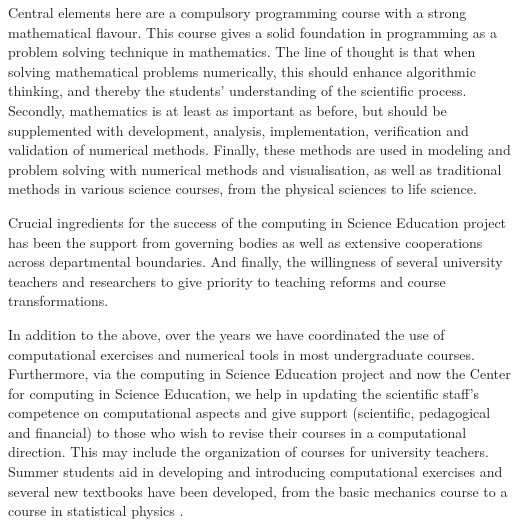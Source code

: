 \documentclass[graybox,envcountchap,sectrefs]{svmult}
\begin{document}
Central elements here are a compulsory programming course with a
strong mathematical flavour. This course gives a solid foundation in
programming as a problem solving technique in mathematics. The line of
thought is that when solving mathematical problems numerically, this should enhance
algorithmic thinking, and thereby the students' understanding of the
scientific process.  Secondly, mathematics is at least as important as
before, but should be supplemented with development, analysis,
implementation, verification and validation of numerical
methods. Finally, these methods are used in modeling and problem
solving with numerical methods and visualisation, as well as
traditional methods in various science courses, from the physical
sciences to life science.

Crucial ingredients for the success of the computing in Science
Education project has been the support from governing bodies as well
as extensive cooperations across departmental boundaries. And finally,
the willingness of several university teachers and researchers to give
priority to teaching reforms and course transformations.

In addition to the above, over the years we have coordinated the use
of computational exercises and numerical tools in most undergraduate
courses. Furthermore, via the computing in Science Education project
and now the Center for computing in Science Education, we help in
updating the scientific staff's competence on computational aspects
and give support (scientific, pedagogical and financial) to those who
wish to revise their courses in a computational direction. This may
include the organization of courses for university teachers. Summer
students aid in developing and introducing computational exercises and
several new textbooks have been developed, from the basic mechanics
course to a course in statistical physics \cite{AMS2015, AIV2018,AMSDS2019}.
\end{document}

